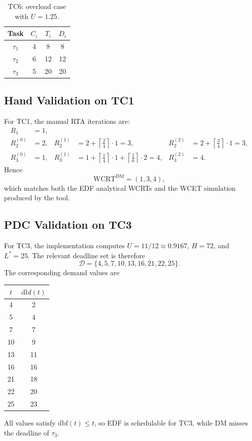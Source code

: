 \documentclass[11pt,a4paper]{article}
\begin{document}
\begin{table}[h]
\centering
\small
\begin{tabular}{|c|c|c|c|}
\hline
Task & \(C_i\) & \(T_i\) & \(D_i\) \\
\hline
\(\tau_1\) & 4 & 8 & 8 \\
\hline
\(\tau_2\) & 6 & 12 & 12 \\
\hline
\(\tau_3\) & 5 & 20 & 20 \\
\hline
\end{tabular}
\caption{TC6: overload case with \(U=1.25\).}
\label{tab:tc6}
\end{table}

\subsection{Hand Validation on TC1}
For TC1, the manual RTA iterations are:
\begin{align}
R_1 &= 1, \\
R_2^{(0)} &= 2, & R_2^{(1)} &= 2 + \left\lceil \frac{2}{4} \right\rceil\cdot 1 = 3, & R_2^{(2)} &= 2 + \left\lceil \frac{3}{4} \right\rceil\cdot 1 = 3, \\
R_3^{(0)} &= 1, & R_3^{(1)} &= 1 + \left\lceil \frac{1}{4} \right\rceil\cdot 1 + \left\lceil \frac{1}{6} \right\rceil\cdot 2 = 4, & R_3^{(2)} &= 4.
\end{align}
Hence
\begin{equation}
\mathrm{WCRT}^{\mathrm{DM}} = (1,3,4),
\end{equation}
which matches both the EDF analytical WCRTs and the WCET simulation produced by the tool.

\subsection{PDC Validation on TC3}
For TC3, the implementation computes \(U = 11/12 \approx 0.9167\), \(H = 72\), and \(L^* = 25\). The relevant deadline set is therefore
\begin{equation}
\mathcal{D} = \{4,5,7,10,13,16,21,22,25\}.
\end{equation}
The corresponding demand values are
\begin{center}
\small
\begin{tabular}{|c|c|}
\hline
\(t\) & \(\mathrm{dbf}(t)\) \\
\hline
4 & 2 \\
5 & 4 \\
7 & 7 \\
10 & 9 \\
13 & 11 \\
16 & 16 \\
21 & 18 \\
22 & 20 \\
25 & 23 \\
\hline
\end{tabular}
\end{center}
All values satisfy \(\mathrm{dbf}(t) \leq t\), so EDF is schedulable for TC3, while DM misses the deadline of \(\tau_3\).
\end{document}
